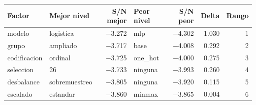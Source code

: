 \begin{tabular}{llrlrrr}
\toprule
Factor & Mejor nivel & S/N mejor & Peor nivel & S/N peor & Delta & Rango \\
\midrule
modelo & logistica & $-$3.272 & mlp & $-$4.302 & 1.030 & 1 \\
grupo & ampliado & $-$3.717 & base & $-$4.008 & 0.292 & 2 \\
codificacion & ordinal & $-$3.725 & one\_hot & $-$4.000 & 0.275 & 3 \\
seleccion & 26 & $-$3.733 & ninguna & $-$3.993 & 0.260 & 4 \\
desbalance & sobremuestreo & $-$3.805 & ninguna & $-$3.920 & 0.115 & 5 \\
escalado & estandar & $-$3.860 & minmax & $-$3.865 & 0.004 & 6 \\
\bottomrule
\end{tabular}
